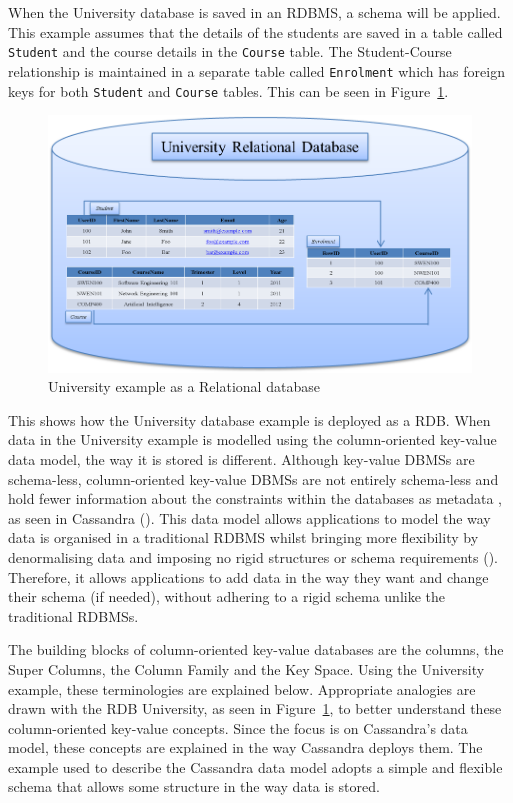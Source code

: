 When the University database is saved in an \ac{RDBMS},   a schema will be
applied. This example assumes that the details of the students are saved in a
table called \texttt{Student} and the course details in the \texttt{Course}
table. The Student-Course relationship is maintained in a separate table called
\texttt{Enrolment} which has foreign keys for both \texttt{Student} and
\texttt{Course} tables.  This can be seen in Figure~\ref{f:RDB}. 


\begin{figure}[h]
	\centering
	\includegraphics[width=.8\textwidth]{./figure/Example/Relational-DB.png}
	\caption{University example as a Relational database}\label{f:RDB}
\end{figure}

This shows how the University database example is deployed as a
\ac{RDB}.  When data in the University example is modelled using the
column-oriented key-value data model,   the way it is stored is different. 
Although key-value \acp{DBMS} are schema-less,   column-oriented key-value
\acp{DBMS} are not entirely schema-less and hold fewer information about the
constraints within the databases as metadata ,   as seen in Cassandra
().  This data model allows
applications to model the way data is organised in a traditional RDBMS whilst
bringing more flexibility by denormalising data and imposing no rigid structures
or schema requirements ().  Therefore,   it allows
applications to add data in the way they want and change their schema (if
needed),   without adhering to a rigid
schema unlike the traditional \acp{RDBMS}.

The building blocks of column-oriented key-value databases are the columns,  
the Super Columns,   the Column Family and the Key Space.  Using the
University example,   these terminologies are explained below. 
Appropriate analogies are drawn with the \ac{RDB} University,   as
seen in Figure~\ref{f:RDB},   to better understand these column-oriented key-value
concepts.  Since the focus is on Cassandra's data model,   these concepts
are explained in the way Cassandra deploys them.  The example used
to describe the Cassandra data model adopts a simple and flexible schema that
allows some structure in the way data is stored. 


